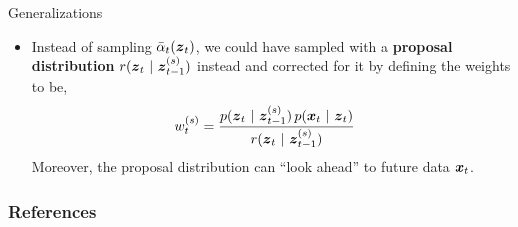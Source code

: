 \documentclass[aspectratio=169]{beamer}
\begin{document}
\begin{frame}{Generalizations}
    \begin{itemize}
        \item Instead of sampling $\bar{\alpha}_{t}(\boldsymbol{z}_{t})$, we could have sampled with a \textbf{proposal distribution} $r(\boldsymbol{z}_{t} ~\vert~ \boldsymbol{z}_{t-1}^{(s)})$ instead and corrected for it by defining the weights to be,
        \begin{align}
            w_t^{(s)} &= \frac{p(\boldsymbol{z}_{t} ~\vert~ \boldsymbol{z}_{t-1}^{(s)}) \, p(\boldsymbol{x}_t ~\vert~ \boldsymbol{z}_t)}{r(\boldsymbol{z}_{t} ~\vert~ \boldsymbol{z}_{t-1}^{(s)})}
        \end{align}
        Moreover, the proposal distribution can ``look ahead'' to future data $\boldsymbol{x}_t$.
    \end{itemize}
\end{frame}

\begin{frame}[t,allowframebreaks]
        \frametitle{References}
        
        
\end{frame}
\end{document}
